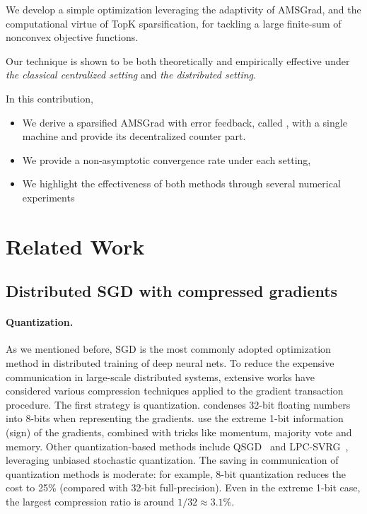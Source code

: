 \documentclass[11pt]{article}
\begin{document}
We develop a simple optimization leveraging the adaptivity of AMSGrad, and the computational virtue of TopK sparsification, for tackling a large finite-sum of nonconvex objective functions.

Our technique is shown to be both theoretically and empirically effective under \emph{the classical centralized setting} and \emph{the distributed setting}.

In this contribution, 
\begin{itemize}
\item We derive a sparsified AMSGrad with error feedback, called \algo, with a single machine and provide its decentralized counter part.
\item We provide a non-asymptotic convergence rate under each setting,
\item We highlight the effectiveness of both methods through several numerical experiments
\end{itemize}


\section{Related Work}\label{sec:related}

\subsection{Distributed SGD with compressed gradients}

\paragraph{Quantization.} As we mentioned before, SGD is the most commonly adopted optimization method in distributed training of deep neural nets. To reduce the expensive communication in large-scale distributed systems, extensive works have considered various compression techniques applied to the gradient transaction procedure. The first strategy is quantization. \cite{Proc:8-bit_ICLR16} condenses 32-bit floating numbers into 8-bits when representing the gradients. \cite{Proc:Seide14,bernstein2018signsgd,karimireddy2019error,Proc:Bernstein_ICLR19} use the extreme 1-bit information (sign) of the gradients, combined with tricks like momentum, majority vote and memory. Other quantization-based methods include QSGD~\cite{alistarh2017qsgd,Proc:Wu_ICML18,Proc:Zhang_ICML17} and LPC-SVRG~\cite{Proc:Yu_AISTATS19}, leveraging unbiased stochastic quantization. The saving in communication of quantization methods is moderate: for example, 8-bit quantization reduces the cost to 25\% (compared with 32-bit full-precision). Even in the extreme 1-bit case, the largest compression ratio is around $1/32\approx 3.1\%$. 
\end{document}
